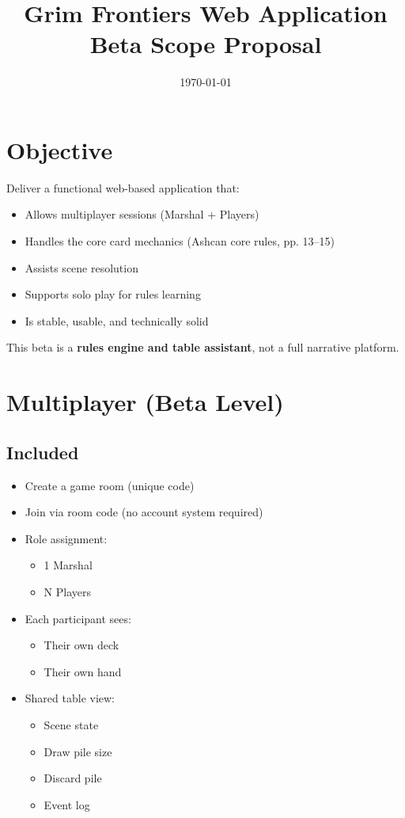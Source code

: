 \documentclass[11pt,a4paper]{article}
\title{\textbf{Grim Frontiers Web Application}\\
\large Beta Scope Proposal}
\author{}
\date{\today}
\begin{document}
\maketitle

\section*{Objective}

Deliver a functional web-based application that:

\begin{itemize}[leftmargin=2em]
    \item Allows multiplayer sessions (Marshal + Players)
    \item Handles the core card mechanics (Ashcan core rules, pp. 13--15)
    \item Assists scene resolution
    \item Supports solo play for rules learning
    \item Is stable, usable, and technically solid
\end{itemize}

This beta is a \textbf{rules engine and table assistant}, not a full narrative platform.

\section{Multiplayer (Beta Level)}

\subsection*{Included}

\begin{itemize}[leftmargin=2em]
    \item Create a game room (unique code)
    \item Join via room code (no account system required)
    \item Role assignment:
        \begin{itemize}
            \item 1 Marshal
            \item N Players
        \end{itemize}
    \item Each participant sees:
        \begin{itemize}
            \item Their own deck
            \item Their own hand
        \end{itemize}
    \item Shared table view:
        \begin{itemize}
            \item Scene state
            \item Draw pile size
            \item Discard pile
            \item Event log
        \end{itemize}
\end{itemize}
\end{document}
